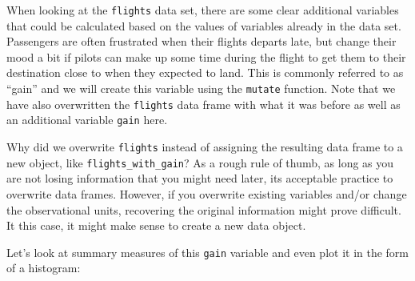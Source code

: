 \documentclass[]{tufte-book}
\newenvironment{Shaded}{\begin{snugshade}}{\end{snugshade}}
\newcommand{\KeywordTok}[1]{\textcolor[rgb]{0.13,0.29,0.53}{\textbf{{#1}}}}
\newcommand{\DataTypeTok}[1]{\textcolor[rgb]{0.13,0.29,0.53}{{#1}}}
\newcommand{\FloatTok}[1]{\textcolor[rgb]{0.00,0.00,0.81}{{#1}}}
\newcommand{\StringTok}[1]{\textcolor[rgb]{0.31,0.60,0.02}{{#1}}}
\newcommand{\OtherTok}[1]{\textcolor[rgb]{0.56,0.35,0.01}{{#1}}}
\newcommand{\NormalTok}[1]{{#1}}
\begin{document}
When looking at the \texttt{flights} data set, there are some clear
additional variables that could be calculated based on the values of
variables already in the data set. Passengers are often frustrated when
their flights departs late, but change their mood a bit if pilots can
make up some time during the flight to get them to their destination
close to when they expected to land. This is commonly referred to as
``gain'' and we will create this variable using the \texttt{mutate}
function. Note that we have also overwritten the \texttt{flights} data
frame with what it was before as well as an additional variable
\texttt{gain} here.

\begin{Shaded}
\end{Shaded}

Why did we overwrite \texttt{flights} instead of assigning the resulting
data frame to a new object, like \texttt{flights\_with\_gain}? As a
rough rule of thumb, as long as you are not losing information that you
might need later, its acceptable practice to overwrite data frames.
However, if you overwrite existing variables and/or change the
observational units, recovering the original information might prove
difficult. It this case, it might make sense to create a new data
object.

Let's look at summary measures of this \texttt{gain} variable and even
plot it in the form of a histogram:

\begin{Shaded}
\end{Shaded}
\end{document}
